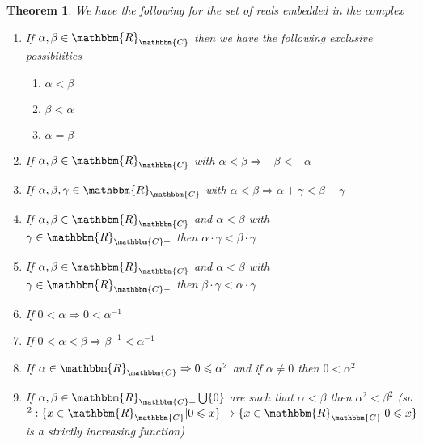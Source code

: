 \documentclass{book}
\newcommand{\um}{-}
\newcommand{\upl}{+}
\newtheorem{theorem}{Theorem}
\begin{document}
{{\begin{theorem}
  \label{properties of positive, negative embedded reals}We have the following
  for the set of reals embedded in the complex
  \begin{enumerate}
    \item If $\alpha, \beta \in \mathbbm{R}_{\mathbbm{C}}$ then we have the
    following exclusive possibilities
    \begin{enumerate}
      \item $\alpha < \beta$
      
      \item $\beta < \alpha$
      
      \item $\alpha = \beta$
    \end{enumerate}
    \item If $\alpha, \beta \in \mathbbm{R}_{\mathbbm{C}}$ with $\alpha <
    \beta \Rightarrow - \beta < \um \alpha$
    
    \item If $\alpha, \beta, \gamma \in \mathbbm{R}_{\mathbbm{C}}$ with
    $\alpha < \beta \Rightarrow \alpha \upl \gamma < \beta \upl \gamma$
    
    \item If $\alpha, \beta \in \mathbbm{R}_{\mathbbm{C}}$ and $\alpha <
    \beta$ with $\gamma \in \mathbbm{R}_{\mathbbm{C}+}$ then $\alpha \cdot
    \gamma < \beta \cdot \gamma$
    
    \item If $\alpha, \beta \in \mathbbm{R}_{\mathbbm{C}}$ and $\alpha <
    \beta$ with $\gamma \in \mathbbm{R}_{\mathbbm{C}-}$ then $\beta \cdot
    \gamma < \alpha \cdot \gamma$
    
    \item If $0 < \alpha \Rightarrow 0 < \alpha^{- 1}$
    
    \item If $0 < \alpha < \beta \Rightarrow \beta^{- 1} < \alpha^{- 1}$
    
    \item If $\alpha \in \mathbbm{R}_{\mathbbm{C}} \Rightarrow 0 \leqslant
    \alpha^2$ and if $\alpha \neq 0$ then $0 < \alpha^2$
    
    \item If $\alpha, \beta \in \mathbbm{R}_{\mathbbm{C}+} \bigcup \{ 0 \}$
    are such that $\alpha < \beta$ then $\alpha^2 < \beta^2$ (so $^2 : \{ x
    \in \mathbbm{R}_{\mathbbm{C}} |0 \leqslant x \} \rightarrow \{ x \in
    \mathbbm{R}_{\mathbbm{C}} |0 \leqslant x \}$ is a strictly increasing
    function)
    

\end{enumerate}
\end{theorem}}}
\end{document}
